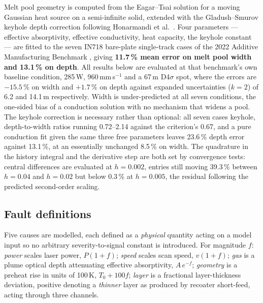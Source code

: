 \documentclass[preprint,times]{elsarticle}
\begin{document}
Melt pool geometry is computed from the Eagar--Tsai solution for a moving Gaussian
heat source on a semi-infinite solid, extended with the Gladush--Smurov keyhole
depth correction following Honarmandi et al.\ \cite{Hon2021}. Four parameters ---
effective absorptivity, effective conductivity, heat capacity, the keyhole
constant --- are fitted to the seven IN718 bare-plate single-track cases of the
2022 Additive Manufacturing Benchmark \cite{Weaver2024}, giving \textbf{11.7\,\% mean error on melt pool width and 13.1\,\% on depth}. All results below are evaluated at that benchmark's own baseline condition,
285\,W, 960\,mm\,s$^{-1}$ and a 67\,\textmu m D4$\sigma$ spot, where the errors
are $-15.5$\,\% on width and $+1.7$\,\% on depth against expanded uncertainties
($k=2$) of 6.2 and 14.1\,\textmu m respectively. Width is under-predicted at all seven conditions, the one-sided bias of a
conduction solution with no mechanism that widens a pool. The keyhole correction
is necessary rather than optional: all seven cases keyhole, depth-to-width
ratios running 0.72--2.14 against the criterion's 0.67, and a pure conduction
fit given the same three free parameters leaves 23.6\,\% depth error against
13.1\,\%, at an essentially unchanged 8.5\,\% on width. The quadrature in the
history integral and the derivative step are both set by convergence tests:
central differences are evaluated at $h=0.002$, entries still moving 39.3\,\%
between $h=0.04$ and $h=0.02$ but below 0.3\,\% at $h=0.005$, the residual
following the predicted second-order scaling.

\subsection{Fault definitions}

Five causes are modelled, each defined as a \emph{physical} quantity acting on a
model input so no arbitrary severity-to-signal constant is introduced. For
magnitude $f$: \emph{power} scales laser power, $P(1+f)$; \emph{speed} scales
scan speed, $v(1+f)$; \emph{gas} is a plume optical depth attenuating effective
absorptivity, $A\,e^{-f}$; \emph{geometry} is a preheat rise in units of 100\,K,
$T_0+100f$; \emph{layer} is a fractional layer-thickness deviation, positive
denoting a \emph{thinner} layer as produced by recoater short-feed, acting
through three channels.
\end{document}
